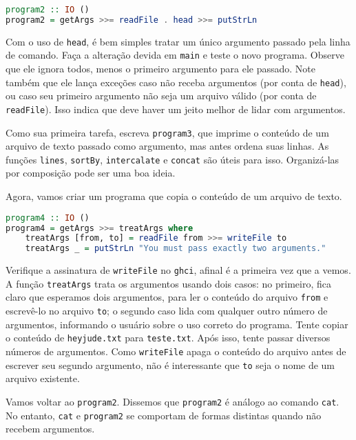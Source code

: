 \documentclass[a4paper]{article}
\begin{document}
\begin{lstlisting}[language=haskell, frame=single]
program2 :: IO ()
program2 = getArgs >>= readFile . head >>= putStrLn
\end{lstlisting}

Com o uso de \texttt{head}, é bem simples tratar um único argumento passado pela linha de comando.
Faça a alteração devida em \texttt{main} e teste o novo programa.
Observe que ele ignora todos, menos o primeiro argumento para ele passado.
Note também que ele lança exceções caso não receba argumentos (por conta de \texttt{head}), ou caso seu primeiro argumento não seja um arquivo válido (por conta de \texttt{readFile}).
Isso indica que deve haver um jeito melhor de lidar com argumentos.

Como sua primeira tarefa, escreva \texttt{program3}, que imprime o conteúdo de um arquivo de texto passado como argumento, mas antes ordena suas linhas.
As funções \texttt{lines}, \texttt{sortBy}, \texttt{intercalate} e \texttt{concat} são úteis para isso.
Organizá-las por composição pode ser uma boa ideia.

Agora, vamos criar um programa que copia o conteúdo de um arquivo de texto.

\begin{lstlisting}[language=haskell, frame=single]
program4 :: IO ()
program4 = getArgs >>= treatArgs where
	treatArgs [from, to] = readFile from >>= writeFile to
	treatArgs _ = putStrLn "You must pass exactly two arguments."
\end{lstlisting}

Verifique a assinatura de \texttt{writeFile} no \texttt{ghci}, afinal é a primeira vez que a vemos.
A função \texttt{treatArgs} trata os argumentos usando dois casos:
no primeiro, fica claro que esperamos dois argumentos, para ler o conteúdo do arquivo \texttt{from} e escrevê-lo no arquivo \texttt{to};
o segundo caso lida com qualquer outro número de argumentos, informando o usuário sobre o uso correto do programa.
Tente copiar o conteúdo de \texttt{heyjude.txt} para \texttt{teste.txt}.
Após isso, tente passar diversos números de argumentos.
Como \texttt{writeFile} apaga o conteúdo do arquivo antes de escrever seu segundo argumento, não é interessante que \texttt{to} seja o nome de um arquivo existente.

Vamos voltar ao \texttt{program2}.
Dissemos que \texttt{program2} é análogo ao comando \texttt{cat}.
No entanto, \texttt{cat} e \texttt{program2} se comportam de formas distintas quando não recebem argumentos.
\end{document}
